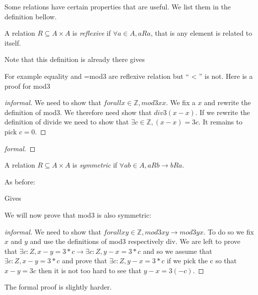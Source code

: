 Some relations have certain properties that are useful. We list them in the definition bellow. 
\begin{definition}[reflexive]
A relation $R \subseteq A\times A$ is {\it reflexive} if $\forall a \in A, a Ra$, that is any element is related to itself.
\end{definition}

Note that this definition is already there
gives


For example equality and =mod3  are reflexive relation but `` < '' is not. Here is a proof for mod3

\begin{proof}[informal]
We need to show that $forall x \in \mathbb{Z}, mod3 x x$. We fix a $x$ and rewrite the definition of mod3. We therefore need show that $div 3 (x-x)$. If we rewrite  the definition of divide we need to show that $\exists c \in \mathbb{Z}, (x-x) = 3c$. It remains to pick $c=0$.
\end{proof}
\begin{proof}[formal]
\end{proof}

 \begin{definition}[symmetric]
A relation $R\subseteq A\times A$ is {\it symmetric} if $\forall a b\in A, a R b \rightarrow b R a$.
\end{definition}

As before:

Gives


We will now prove that mod3 is also symmetric:
\begin{proof}[informal]
We need to show that $forall x y \in \mathbb{Z}, mod3 x y \rightarrow mod3 y x$. To do so we fix $x$ and $y$ and use the definitions of mod3 respectively div. We are left to prove that $\exists c : Z, x - y = 3 * c\rightarrow \exists c : Z, y - x = 3 * c$ and so we assume that $\exists c : Z, x - y = 3 * c$ and prove that $\exists c : Z, y- x = 3 * c$ if we pick the c so that $x-y =3c$ then it is not too hard to see that $y-x = 3(-c)$.
\end{proof}
The formal proof is slightly harder.

